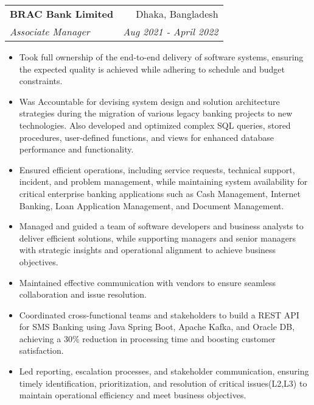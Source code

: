 \documentclass[letterpaper,11pt]{article}
\makeatletter
\newcommand{\resumeItem}[2]{
  \item\small{
    \textbf{#1}{#2 \vspace{-2pt}}
  }
}
\newcommand{\resumeSubheading}[4]{
  \vspace{-1pt}\item
    \begin{tabular*}{0.97\textwidth}[t]{l@{\extracolsep{\fill}}r}
      \textbf{#1} & #2 \\
      \textit{\small#3} & \textit{\small #4} \\
    \end{tabular*}\vspace{-5pt}
}
\newcommand{\resumeItemListStart}{\begin{itemize}}
\newcommand{\resumeItemListEnd}{\end{itemize}\vspace{-5pt}}
\makeatother
\begin{document}
    \resumeSubheading
      {BRAC Bank Limited}{Dhaka, Bangladesh}
      {Associate Manager}{Aug 2021 - April 2022}
      \resumeItemListStart
        \resumeItem{}
          {Took full ownership of the end-to-end delivery of software systems, ensuring the expected quality is achieved while adhering to schedule and budget constraints.}
        \resumeItem{}
          {Was Accountable for devising system design and solution architecture strategies during the migration of various legacy banking projects to new technologies. Also developed and optimized complex SQL queries, stored procedures, user-defined functions, and views for enhanced database performance and functionality.}
        \resumeItem{}
        {Ensured efficient operations, including service requests, technical support, incident, and problem management, while maintaining system availability for critical enterprise banking applications such as Cash Management, Internet Banking, Loan Application Management, and Document Management.}
        \resumeItem{}
        {Managed and guided a team of software developers and business analysts to deliver efficient solutions, while supporting managers and senior managers with strategic insights and operational alignment to achieve business objectives.}
        \resumeItem{}
          {Maintained effective communication with vendors to ensure seamless collaboration and issue resolution.}
        \resumeItem{}
          {Coordinated cross-functional teams and stakeholders to build a REST API for SMS Banking using Java Spring Boot, Apache Kafka, and Oracle DB, achieving a 30\% reduction in processing time and boosting customer satisfaction.}
        \resumeItem{}
        {Led reporting, escalation processes, and stakeholder communication, ensuring timely identification, prioritization, and resolution of critical issues(L2,L3) to maintain operational efficiency and meet business objectives.}
    
      \resumeItemListEnd
\end{document}
